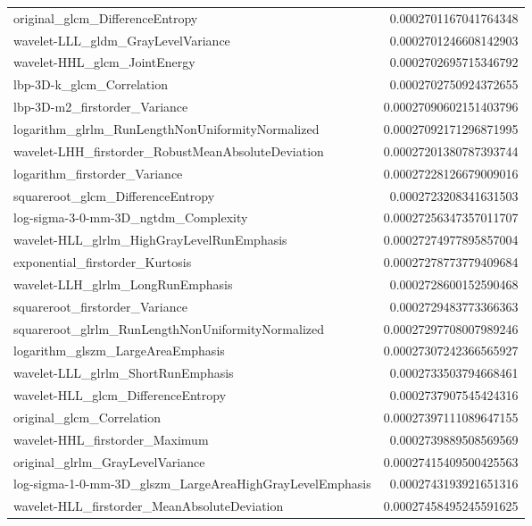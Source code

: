 {\begin{xltabular}[H]{\textwidth}{X r}
        original\_glcm\_DifferenceEntropy & 0.0002701167041764348 \\
        wavelet-LLL\_gldm\_GrayLevelVariance & 0.0002701246608142903 \\
        wavelet-HHL\_glcm\_JointEnergy & 0.0002702695715346792 \\
        lbp-3D-k\_glcm\_Correlation & 0.0002702750924372655 \\
        lbp-3D-m2\_firstorder\_Variance & 0.00027090602151403796 \\
        logarithm\_glrlm\_RunLengthNonUniformityNormalized & 0.00027092171296871995 \\
        wavelet-LHH\_firstorder\_RobustMeanAbsoluteDeviation & 0.00027201380787393744 \\
        logarithm\_firstorder\_Variance & 0.00027228126679009016 \\
        squareroot\_glcm\_DifferenceEntropy & 0.0002723208341631503 \\
        log-sigma-3-0-mm-3D\_ngtdm\_Complexity & 0.00027256347357011707 \\
        wavelet-HLL\_glrlm\_HighGrayLevelRunEmphasis & 0.00027274977895857004 \\
        exponential\_firstorder\_Kurtosis & 0.00027278773779409684 \\
        wavelet-LLH\_glrlm\_LongRunEmphasis & 0.0002728600152590468 \\
        squareroot\_firstorder\_Variance & 0.0002729483773366363 \\
        squareroot\_glrlm\_RunLengthNonUniformityNormalized & 0.00027297708007989246 \\
        logarithm\_glszm\_LargeAreaEmphasis & 0.00027307242366565927 \\
        wavelet-LLL\_glrlm\_ShortRunEmphasis & 0.0002733503794668461 \\
        wavelet-HLL\_glcm\_DifferenceEntropy & 0.0002737907545424316 \\
        original\_glcm\_Correlation & 0.00027397111089647155 \\
        wavelet-HHL\_firstorder\_Maximum & 0.0002739889508569569 \\
        original\_glrlm\_GrayLevelVariance & 0.00027415409500425563 \\
        log-sigma-1-0-mm-3D\_glszm\_LargeAreaHighGrayLevelEmphasis & 0.0002743193921651316 \\
        wavelet-HLL\_firstorder\_MeanAbsoluteDeviation & 0.00027458495245591625 \\

\end{xltabular}}
